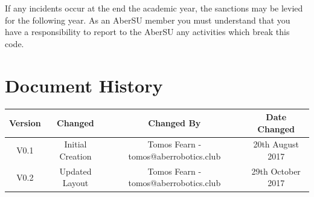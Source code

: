 \documentclass[a4paper,11pt]{article}
\begin{document}
If any incidents occur at the end the academic year, the sanctions may be levied for the following year. As an AberSU member you must understand that you have a responsibility to report to the AberSU any activities which break this code.




\section*{Document History}

\begin{center}
\begin{tabular}{ |c|c|c|c| } 
\hline
Version & Changed & Changed By & Date Changed \\
\hline
V0.1 & Initial Creation & Tomos Fearn - tomos@aberrobotics.club & 20th August 2017 \\ 
\hline
V0.2 & Updated Layout & Tomos Fearn - tomos@aberrobotics.club & 29th October 2017 \\ 
\hline
\end{tabular}
\end{center}
\end{document}
